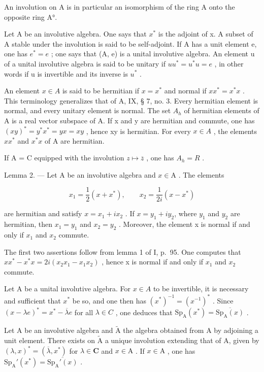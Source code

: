 An involution on A is in particular an isomorphism of the ring A onto the opposite ring A°.

Let A be an involutive algebra. One says that \(x^{*}\) is the adjoint of x. A subset of A stable under the involution is said to be self-adjoint. If A has a unit element e, one has \(e^{*} = e\) ; one says that (A, e) is a unital involutive algebra. An element u of a unital involutive algebra is said to be unitary if \(uu^{*} = u^{*}u = e\) , in other words if u is invertible and its inverse is \(u^{*}\) .

An element \(x \in A\) is said to be hermitian if \(x = x^{*}\) and normal if \(xx^{*} = x^{*}x\) . This terminology generalizes that of A, IX, § 7, no. 3. Every hermitian element is normal, and every unitary element is normal. The set \(A_{h}\) of hermitian elements of A is a real vector subspace of A. If x and y are hermitian and commute, one has \((xy)^{*} = y^{*}x^{*} = yx = xy\) , hence xy is hermitian. For every \(x \in A\) , the elements \(xx^{*}\) and \(x^{*}x\) of A are hermitian.

If A = C equipped with the involution \(z \mapsto \overline{z}\) , one has \(A_{h} = R\) .

Lemma 2. --- Let A be an involutive algebra and \(x \in \mathrm{A}\) . The elements

\[
x _ {1} = \frac {1}{2} (x + x ^ {*}), \qquad x _ {2} = \frac {1}{2 i} (x - x ^ {*})
\]

are hermitian and satisfy \(x = x_{1} + ix_{2}\) . If \(x = y_{1} + iy_{2}\), where \(y_{1}\) and \(y_{2}\) are hermitian, then \(x_{1} = y_{1}\) and \(x_{2} = y_{2}\) . Moreover, the element x is normal if and only if \(x_{1}\) and \(x_{2}\) commute.

The first two assertions follow from lemma 1 of I, p.~95. One computes that \(xx^{*} - x^{*}x = 2i(x_{2}x_{1} - x_{1}x_{2})\) , hence x is normal if and only if \(x_{1}\) and \(x_{2}\) commute.

Let A be a unital involutive algebra. For \(x \in A\) to be invertible, it is necessary and sufficient that \(x^{*}\) be so, and one then has \((x^{*})^{-1} = (x^{-1})^{*}\) . Since \((x - \lambda e)^{*} = x^{*} - \overline{\lambda}e\) for all \(\lambda \in C\) , one deduces that \(\mathrm{Sp}_{\mathrm{A}}(x^{*}) = \overline{\mathrm{Sp}_{\mathrm{A}}(x)}\) .

Let A be an involutive algebra and \(\widetilde{\mathrm{A}}\) the algebra obtained from A by adjoining a unit element. There exists on \(\widetilde{\mathrm{A}}\) a unique involution extending that of A, given by \((\lambda, x)^{*} = (\overline{\lambda}, x^{*})\) for \(\lambda \in \mathbf{C}\) and \(x \in \mathrm{A}\) . If \(x \in \mathrm{A}\) , one has \(\mathrm{Sp}_{\mathrm{A}}'(x^{*}) = \overline{\mathrm{Sp}_{\mathrm{A}}'(x)}\) .

